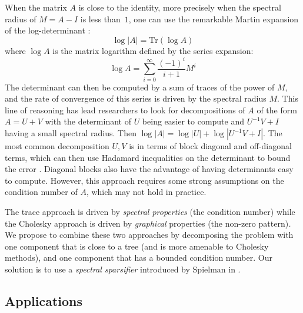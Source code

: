 When the matrix $A$ is close to the identity, more precisely when
the spectral radius of $M=A-I$ is less than~$1$, one can use the
remarkable Martin expansion of the log-determinant \cite{martin1992approximations}:
\begin{equation}
\log\left|A\right|=\text{Tr}\left(\log A\right)\label{eq:martin-expansion}
\end{equation}
where $\log A$ is the matrix logarithm defined by the series expansion:
\begin{equation}
\log A=\sum_{i=0}^{\infty}\frac{\left(-1\right)^{i}}{i+1}M^{i}\label{eq:matrix-log}
\end{equation}
The determinant can then be computed by a sum of traces of the power
of $M$, and the rate of convergence of this series is driven by the
spectral radius $M$. This line of reasoning has lead researchers
to look for decompositions of $A$ of the form $A=U+V$ with the determinant
of $U$ being easier to compute and $U^{-1}V+I$ having a small spectral
radius. Then $\log\left|A\right|=\log\left|U\right|+\log\left|U^{-1}V+I\right|$.
The most common decomposition $U,V$ is in terms of block diagonal
and off-diagonal terms, which can then use Hadamard inequalities on
the determinant to bound the error \cite{Ipsen2006}. Diagonal blocks
also have the advantage of having determinants easy to compute. However,
this approach requires some strong assumptions on the condition number
of $A$, which may not hold in practice.

The trace approach is driven by \emph{spectral properties }(the condition
number) while the Cholesky approach is driven by \emph{graphical }properties\emph{
}(the non-zero pattern)\emph{. }We\emph{ }propose to combine these
two approaches by decomposing the problem with one component that
is close to a tree (and is more amenable to Cholesky methods), and
one component that has a bounded condition number. Our solution is
to use a \emph{spectral sparsifier} introduced by Spielman in \cite{Spielman2008}.


\subsection{Applications}

